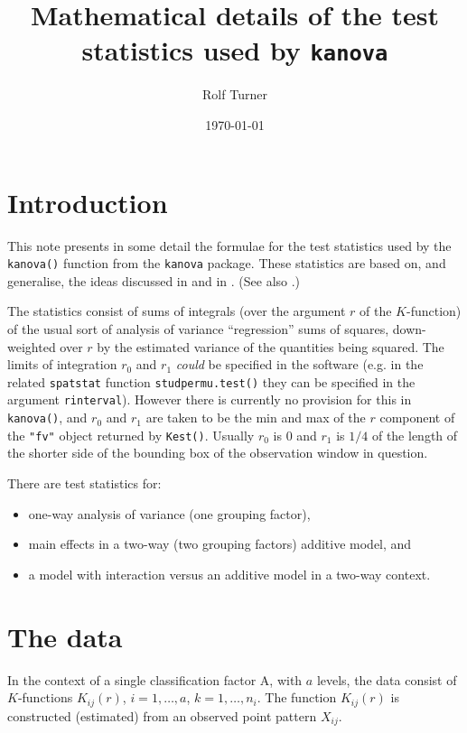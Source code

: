 \documentclass[12pt]{article}
\begin{document}
\title{Mathematical details of the test statistics used by \texttt{kanova}}
\author{Rolf Turner}
\date{\today}
\maketitle

\section{Introduction}
\label{sec:intro}
This note presents in some detail the formulae for the test
statistics used by the \texttt{kanova()} function from the
\texttt{kanova} package.  These statistics are based on, and
generalise, the ideas discussed in \cite{DiggleEtAl2000} and in
\cite{Hahn2012}.  (See also \cite{DiggleEtAl1991}.)

The statistics consist of sums of integrals (over the argument $r$
of the $K$-function) of the usual sort of analysis of variance
``regression'' sums of squares, down-weighted over $r$ by the
estimated variance of the quantities being squared.  The limits
of integration $r_0$ and $r_1$ \emph{could} be specified in
the software (e.g. in the related \texttt{spatstat} function
\texttt{studpermu.test()} they can be specified in the argument
\texttt{rinterval}).  However there is currently no provision
for this in \texttt{kanova()}, and $r_0$ and $r_1$ are taken
to be the min and max of the $r$ component of the \texttt{"fv"}
object returned by \texttt{Kest()}.   Usually $r_0$ is 0 and $r_1$
is $1/4$ of the length of the shorter side of the bounding box of
the observation window in question.

There are test statistics for:
\begin{itemize}
\item one-way analysis of variance (one grouping factor),
\item main effects in a two-way (two grouping factors) additive model, and
\item a model with interaction versus an additive model in a two-way
context.
\end{itemize}

\section{The data}
In the context of a single classification factor A, with $a$ levels,
the data consist of $K$-functions $K_{ij}(r)$, $i = 1, \ldots,
a$, $k = 1, \ldots, n_i$.  The function $K_{ij}(r)$ is constructed
(estimated) from an observed point pattern $X_{ij}$.
\end{document}
